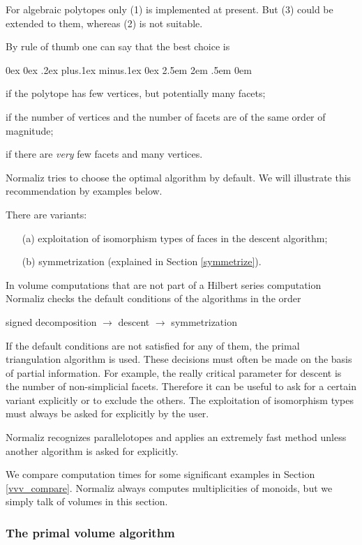 \documentclass[12pt,a4paper]{scrartcl}
\newcounter{listi}
\newcommand{\stdli}{ \topsep0ex \partopsep0ex %
\parsep.2ex plus.1ex minus.1ex \itemsep0ex%
\leftmargin2.5em \labelwidth2em \labelsep.5em \rightmargin0em}%
\newenvironment{arab}{\begin{list}{\textup{(\arabic{listi})}}%
	{\usecounter{listi}\stdli}}{\end{list}}
\theoremstyle{definition}
\begin{document}
For algebraic polytopes only (1) is implemented at present. But (3) could be extended to them, whereas (2) is not suitable.

By rule of thumb one can say that  the best choice is
\begin{arab}
\item if the polytope has few vertices, but potentially many facets;
\item  if the number of vertices and the number of facets are of the same order of magnitude;
\item  if there are \emph{very} few facets and many vertices.
\end{arab}
Normaliz tries to choose the optimal algorithm by default. We will illustrate this recommendation by examples below.

There are variants:
\begin{enumerate}
\item[(a)] exploitation of isomorphism types of faces in the descent algorithm;
\item[(b)] symmetrization (explained in Section \ref{symmetrize}).
\end{enumerate}

In volume computations that are not part of a Hilbert series computation Normaliz checks the default conditions of the algorithms in the order
\begin{center}
signed decomposition $\to$  descent  $\to$ symmetrization
\end{center}
If the default conditions are not satisfied for any of them, the primal triangulation algorithm is used. These decisions must often be made on the basis of partial information. For example, the really critical parameter for descent is the number of non-simplicial facets. Therefore it can be useful to ask for a certain variant explicitly or to exclude the others. The exploitation of isomorphism types must always be asked for explicitly by the user.

Normaliz recognizes parallelotopes and applies an extremely fast method unless another algorithm is asked for explicitly.

We compare computation times for some significant examples in Section \ref{vvv_compare}. Normaliz always computes multiplicities of monoids, but we simply talk of volumes in this section.

\subsubsection{The primal volume algorithm}
\end{document}
